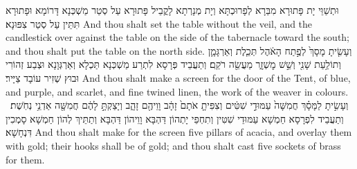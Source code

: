 {וּתְשַׁוֵּי יָת פָּתוּרָא מִבַּרָא לְפָרוּכְתָּא וְיָת מְנָרְתָא לָקֳבֵיל פָּתוּרָא עַל סְטַר מַשְׁכְּנָא דָּרוֹמָא וּפָתוּרָא תִּתֵּין עַל סְטַר צִפּוּנָא׃}
{And thou shalt set the table without the veil, and the candlestick over against the table on the side of the tabernacle toward the south; and thou shalt put the table on the north side.}{}
{וְעָשִׂ֤יתָ מָסָךְ֙ לְפֶ֣תַח הָאֹ֔הֶל תְּכֵ֧לֶת וְאַרְגָּמָ֛ן וְתוֹלַ֥עַת שָׁנִ֖י וְשֵׁ֣שׁ מׇשְׁזָ֑ר מַעֲשֵׂ֖ה רֹקֵֽם׃}
{וְתַעֲבֵיד פְּרָסָא לִתְרַע מַשְׁכְּנָא תַּכְלָא וְאַרְגְּוָנָא וּצְבַע זְהוֹרִי וּבוּץ שְׁזִיר עוֹבָד צַיָּיר׃}
{And thou shalt make a screen for the door of the Tent, of blue, and purple, and scarlet, and fine twined linen, the work of the weaver in colours.}{}
{וְעָשִׂ֣יתָ לַמָּסָ֗ךְ חֲמִשָּׁה֙ עַמּוּדֵ֣י שִׁטִּ֔ים וְצִפִּיתָ֤ אֹתָם֙ זָהָ֔ב וָוֵיהֶ֖ם זָהָ֑ב וְיָצַקְתָּ֣ לָהֶ֔ם חֲמִשָּׁ֖ה אַדְנֵ֥י נְחֹֽשֶׁת׃ \setuma }
{וְתַעֲבֵיד לִפְרָסָא חַמְשָׁא עַמּוּדֵי שִׁטִּין וְתִחְפֵי יָתְהוֹן דַּהְבָּא וָוֵיהוֹן דַּהְבָּא וְתַתֵּיךְ לְהוֹן חַמְשָׁא סָמְכִין דִּנְחָשָׁא׃}
{And thou shalt make for the screen five pillars of acacia, and overlay them with gold; their hooks shall be of gold; and thou shalt cast five sockets of brass for them.}{}

